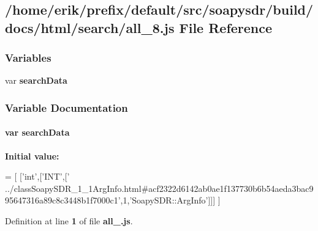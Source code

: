 \subsection{/home/erik/prefix/default/src/soapysdr/build/docs/html/search/all\+\_\+8.js File Reference}
\label{all__8_8js}
\subsubsection*{Variables}
\begin{DoxyCompactItemize}
\item 
var {\bf search\+Data}
\end{DoxyCompactItemize}


\subsubsection{Variable Documentation}
\paragraph[{search\+Data}]{\setlength{\rightskip}{0pt plus 5cm}var search\+Data}\label{all__8_8js_ad01a7523f103d6242ef9b0451861231e}
{\bfseries Initial value\+:}
\begin{DoxyCode}
=
[
  [\textcolor{stringliteral}{'int'},[\textcolor{stringliteral}{'INT'},[\textcolor{stringliteral}{'
      ../classSoapySDR\_1\_1ArgInfo.html#acf2322d6142ab0ae1f137730b6b54aeda3bac995647316a89c8c3448b1f7000c1'},1,\textcolor{stringliteral}{'SoapySDR::ArgInfo'}]]]
]
\end{DoxyCode}


Definition at line {\bf 1} of file {\bf all\+\_.\+js}.

